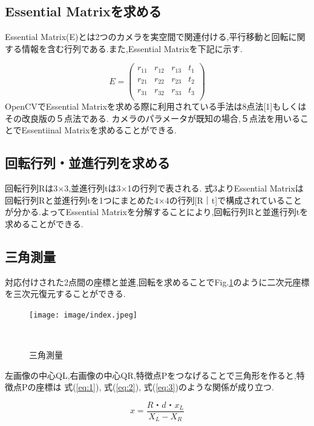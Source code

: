 \documentclass[a4paper]{jarticle}
\begin{document}
\subsection{Essential Matrixを求める}
Essential Matrix(E)とは2つのカメラを実空間で関連付ける,平行移動と回転に関する情報を含む行列である.また,Essential Matrixを下記に示す.

\begin{equation}
       E = \left(
    \begin{array}{cccc}
      r _{11} & r _{12} & r _{13} & t_1\\
      r _{21} & r _{22} & r _{23} & t_2\\
      r _{31} & r _{32} & r _{33} & t_3\\

    \end{array}
  \right)
\end{equation}
OpenCVでEssential Matrixを求める際に利用されている手法は8点法{\scriptsize[1]}もしくはその改良版の５点法である.
カメラのパラメータが既知の場合,５点法を用いることでEssentiinal Matrixを求めることができる.


\subsection{回転行列・並進行列を求める}
回転行列Rは3×3,並進行列tは3×1の行列で表される.
式3よりEssential Matrixは回転行列Rと並進行列tを1つにまとめた4×4の行列[R｜t]で構成されていることが分かる.よってEssential Matrixを分解することにより,回転行列Rと並進行列tを求めることができる.

\subsection{三角測量}
対応付けされた2点間の座標と並進,回転を求めることでFig.\ref{fig:05}のように二次元座標を三次元復元することができる.

\begin{figure}[htbp]
 \begin{center}
  \texttt{[image: image/index.jpeg]}
 　\caption{三角測量}%
 　\label{fig:05}%
 \end{center}
\end{figure}

左画像の中心Q{\scriptsize L},右画像の中心Q{\scriptsize R},特徴点Pをつなげることで三角形を作ると,特徴点Pの座標は
式(\ref{eq:1}), 式(\ref{eq:2}), 式(\ref{eq:3})のような関係が成り立つ.

\begin{equation}
 x=\frac {R・d・x_{L}}{X_{L}-X_{R}}
 \label{eq:1}
\end{equation}
\end{document}
